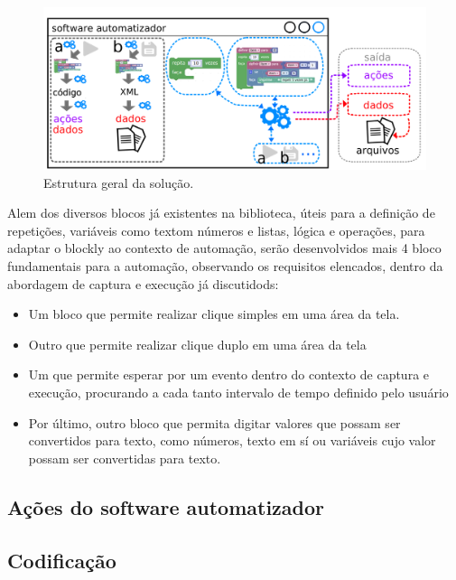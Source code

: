 \documentclass[tg]{mdtufsm}
\begin{document}
                \begin{figure}[!htb]
                    {\centering
                    \includegraphics[width=1.0\textwidth]{imagens/blocklyDiagram}
                    \caption{Estrutura geral da solução.}
                    \label{fig:blocklyDiagram}}
                \end{figure}

                Alem dos diversos blocos já existentes na biblioteca, úteis para a definição de repetições, variáveis como textom números e listas, lógica e operações, para adaptar o blockly ao contexto de automação, serão desenvolvidos mais 4 bloco fundamentais para a automação, observando os requisitos elencados, dentro da abordagem de captura e execução já discutidods:

                \begin{itemize}
                    \item Um bloco que permite realizar clique simples em uma área da tela.
                    \item Outro que permite realizar clique duplo em uma área da tela
                    \item Um que permite esperar por um evento dentro do contexto de captura e execução, procurando a cada tanto intervalo de tempo definido pelo usuário
                    \item Por último, outro bloco que permita digitar valores que possam ser convertidos para texto, como números, texto em sí ou variáveis cujo valor possam ser convertidas para texto.
                \end{itemize}

            \subsection {Ações do software automatizador}

            \subsection {Codificação}
\end{document}
